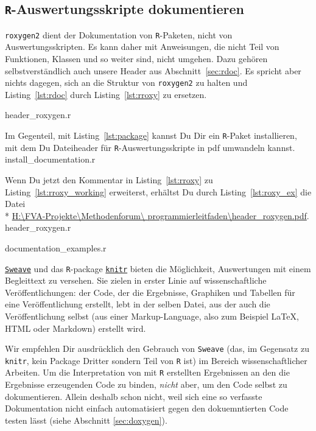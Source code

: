 \documentclass[twoside]{scrreprt}
\providecommand{\R}{\texttt{R}}
\providecommand{\code}[1]{\texttt{#1}}
\providecommand{\proot}{%
H:\textbackslash{}FVA-Projekte\textbackslash{}Methodenforum\textbackslash{}%
}
\providecommand{\pdir}{\proot{}programmierleitfaden\textbackslash{}}
\begin{document}
\subsection{\R{}-Auswertungsskripte dokumentieren
\label{sec:documentation}}
\code{roxygen2} dient der Dokumentation von \R{}-Paketen, nicht von
Auswertungsskripten. Es kann daher mit Anweisungen, die nicht Teil von
Funktionen, Klassen und so weiter sind, nicht umgehen. Dazu geh\"oren
selbstverst\"a{}ndlich auch unsere Header aus Abschnitt~\ref{sec:rdoc}.
Es spricht aber nichts dagegen, sich an die Struktur von \code{roxygen2} zu
halten und Listing~\ref{lst:rdoc} durch Listing~\ref{lst:rroxy} zu ersetzen.

{header_roxygen.r}

Im Gegenteil, mit Listing~\ref{lst:package} kannst Du Dir ein \R{}-Paket
installieren, mit dem Du
Dateiheader
f\"u{}r \R{}-Auswertungsskripte in pdf
umwandeln
kannst.%
{install_documentation.r}

Wenn Du jetzt den Kommentar in  Listing~\ref{lst:rroxy} zu
Listing~\ref{lst:rroxy_working}
erweiterst, erh\"altst Du durch Listing~\ref{lst:roxy_ex}
die Datei \\* \href{header_roxygen.pdf}{\pdir{}header\_roxygen.pdf}. 
%
{header_roxygen.r}

{documentation_examples.r}

\href{http://www.stat.uni-muenchen.de/~leisch/Sweave/}{\code{Sweave}} und das
\R{}-package
\href{http://cran.r-project.org/web/packages/knitr/index.html}{\code{knitr}}
bieten die M\"o{}glichkeit, Auswertungen mit einem Begleittext zu versehen.
Sie zielen in erster Linie auf wissenschaftliche Ver\"o{}ffentlichungen: der
Code, der die Ergebnisse, Graphiken und Tabellen f\"u{}r eine
Ver\"o{}ffentlichung erstellt, lebt in der selben Datei, aus der auch die
Ver\"o{}ffentlichung selbst (aus einer Markup-Language, also zum Beispiel
\LaTeX{}, HTML oder Markdown) erstellt wird.

Wir empfehlen Dir ausdr\"u{}cklich den Gebrauch von \code{Sweave} (das, im
Gegensatz zu \code{knitr}, kein Package Dritter sondern Teil von \R{} ist) im
Bereich wissenschaftlicher Arbeiten.
Um die Interpretation von mit \R{} erstellten Ergebnissen an den die Ergebnisse
erzeugenden Code zu binden, \emph{nicht} aber, um den Code selbst zu
dokumentieren.
Allein deshalb schon nicht, weil sich eine so verfasste Dokumentation nicht
einfach automatisiert gegen den dokuemntierten Code testen l\"a{}sst (siehe
Abschnitt \ref{sec:doxygen}).
\end{document}
